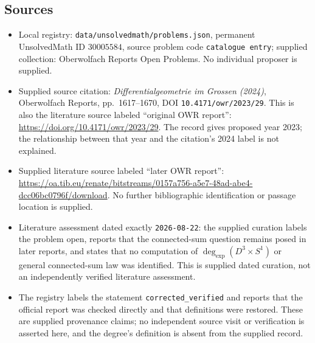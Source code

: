 \documentclass[11pt]{article}
\begin{document}
\subsection{Sources}
\begin{itemize}
\item Local registry: \texttt{data/unsolvedmath/problems.json}, permanent UnsolvedMath ID \(30005584\), source problem code \texttt{catalogue entry}; supplied collection: Oberwolfach Reports Open Problems. No individual proposer is supplied.
\item Supplied source citation: \emph{Differentialgeometrie im Grossen (2024)}, Oberwolfach Reports, pp.\ 1617--1670, DOI \texttt{10.4171/owr/2023/29}. This is also the literature source labeled ``original OWR report'': \url{https://doi.org/10.4171/owr/2023/29}. The record gives proposed year 2023; the relationship between that year and the citation's 2024 label is not explained.
\item Supplied literature source labeled ``later OWR report'': \url{https://oa.tib.eu/renate/bitstreams/0157a756-a5e7-48ad-abe4-dcc06bc0796f/download}. No further bibliographic identification or passage location is supplied.
\item Literature assessment dated exactly \texttt{2026-08-22}: the supplied curation labels the problem open, reports that the connected-sum question remains posed in later reports, and states that no computation of \(\deg_{\exp}(D^3\times S^1)\) or general connected-sum law was identified. This is supplied dated curation, not an independently verified literature assessment.
\item The registry labels the statement \texttt{corrected\_verified} and reports that the official report was checked directly and that definitions were restored. These are supplied provenance claims; no independent source visit or verification is asserted here, and the degree's definition is absent from the supplied record.
\end{itemize}
\end{document}
